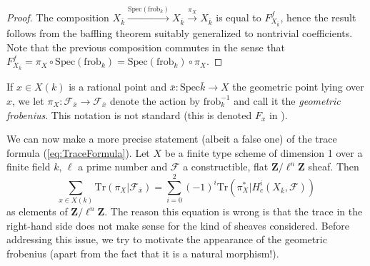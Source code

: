 \begin{proof}
The composition $X_{\bar k} \xrightarrow{\text{Spec}(\text{frob}_k)} X_{\bar k} 
\xrightarrow{\pi_X} X_{\bar k}$ is equal to $F_{X_{\bar k}}^f$, hence the 
result follows from the baffling theorem suitably generalized to nontrivial 
coefficients. Note that the previous composition commutes in the sense that 
$F_{X_{\bar k}}^f = \pi_X \circ \text{Spec}(\text{frob}_k) = 
\text{Spec}(\text{frob}_k) \circ \pi_X$.
\end{proof}

\begin{definition}
If $x \in X(k)$ is a rational point and $\bar x : \text{Spec} \bar k \to X$ the 
geometric point lying over $x$, we let $\pi_X : \mathcal{F}_{\bar x} \to 
\mathcal{F}_{\bar x}$ denote the action by $\text{frob}_k^{-1}$ and call it the 
{\it geometric frobenius}. This notation is not standard (this is denoted 
$F_x$ in \cite{SGA4.5}).
\end{definition}

We can now make a more precise statement (albeit a false one) of the trace 
formula (\ref{eq:TraceFormula}). Let $X$ be a finite type scheme of dimension 1 
over a finite field $k$, $\ell$ a prime number and $\mathcal{F}$ a 
constructible, flat $\mathbf{Z}/\ell^n\mathbf{Z}$ sheaf. Then
$$
\sum_{x \in X(k)} \text{Tr}(\pi_X | \mathcal{F}_{\bar x}) = \sum_{i=0}^2 (-1)^i 
\text{Tr}(\pi_X^* | H^i_c(X_{\bar k}, \mathcal{F}))
$$
as elements of $\mathbf{Z}/\ell^n\mathbf{Z}$. The reason this equation is wrong 
is that the trace in the right-hand side does not make sense for the kind of 
sheaves considered. Before addressing this issue, we try to motivate the 
appearance of the geometric frobenius (apart from the fact that it is a natural 
morphism!). 

